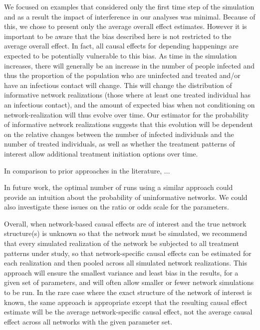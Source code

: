 \documentclass{article}
\theoremstyle{definition}
\begin{document}
We focused on examples that considered only the first time step of the simulation and as a result the impact of interference in our analyses was minimal. Because of this, we chose to present only the average overall effect estimates. However it is important to be aware that the bias described here is not restricted to the average overall effect. In fact, all causal effects for depending happenings are expected to be potentially vulnerable to this bias. As time in the simulation increases, there will generally be an increase in the number of people infected and thus the proportion of the population who are uninfected and treated and/or have an infectious contact will change. This will change the distribution of informative network realizations (those where at least one treated individual has an infectious contact), and the amount of expected bias when not conditioning on network-realization will thus evolve over time. Our estimator for the probability of informative network realizations suggests that this evolution will be dependent on the relative changes between the number of infected individuals and the number of treated individuals, as well as whether the treatment patterns of interest allow additional treatment initiation options over time.



In comparison to prior approaches in the literature, ...

In future work, the optimal number of runs using a similar approach could provide an intuition about the probability of uninformative networks. We could also investigate these issues on the ratio or odds scale for the parameters.

Overall, when network-based causal effects are of interest and the true network structure(s) is unknown so that the network must be simulated, we recommend that every simulated realization of the network be subjected to all treatment patterns under study, so that network-specific causal effects can be estimated for each realization and then pooled across all simulated network realizations. This approach will ensure the smallest variance and least bias in the results, for a given set of parameters, and will often allow smaller or fewer network simulations to be run. In the rare case where the exact structure of the network of interest is known, the same approach is appropriate except that the resulting causal effect estimate will be the average network-specific causal effect, not the average causal effect across all networks with the given parameter set.
\end{document}
